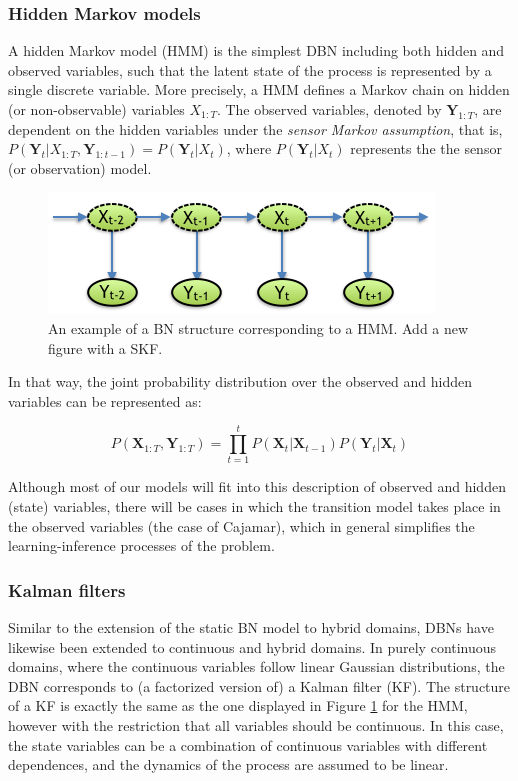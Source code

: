 \subsubsection{Hidden Markov models}\label{SubSubSection:HMMs}
A hidden Markov model (HMM) is the simplest DBN including both hidden and observed variables, such that the latent state of the process is represented by a single discrete variable. More precisely, a HMM defines a Markov chain on hidden (or non-observable) variables $X_{1:T}$. The observed variables, denoted by $\bm Y_{1:T}$, are dependent on the hidden variables under the \textit{sensor Markov assumption}, that is, $P(\bm Y_t| X_{1:T}, \bm Y_{1:t-1}) = P(\bm Y_t| X_t)$, where $P(\bm Y_t| X_t)$ represents the the sensor (or observation) model.  

\begin{figure}[ht!]
\begin{center}
\includegraphics[scale=0.56]{./figures/PreliminariesHMM}
\caption{\label{Figure:HMM}An example of a BN structure corresponding to a HMM. {\color{red} Add a new figure with a SKF.}}
\end{center}
\end{figure}

In that way, the joint probability distribution over the observed and hidden variables can be represented as:

\begin{equation}
P(\bm X_{1:T},\bm Y_{1:T}) = \prod_{t=1}^t{P(\bm X_t| \bm X_{t-1})P(\bm Y_t|\bm X_t)}
\end{equation}

Although most of our models will fit into this description of observed and hidden (state) variables, there will be cases in which the transition model takes place in the observed variables (the case of Cajamar), which in general simplifies the learning-inference processes of the problem.

\subsubsection{Kalman filters}\label{SubSubSection:KFs}
Similar to the extension of the static BN model to hybrid domains, DBNs have likewise been extended to continuous and hybrid domains. In purely continuous domains, where the continuous variables follow linear Gaussian distributions, the DBN corresponds to (a factorized version of) a Kalman filter (KF). The structure of a KF is exactly the same as the one displayed in Figure \ref{Figure:HMM} for the HMM, however with the restriction that all variables should be continuous. In this case, the state variables can be a combination of continuous variables with different dependences, and the dynamics of the process are assumed to be linear. 


